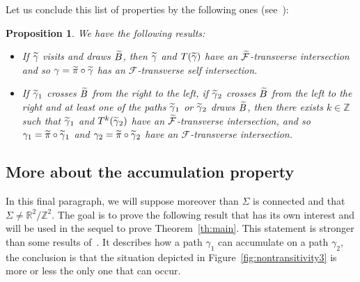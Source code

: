 \documentclass[10pt,a4paper]{article}
\newtheorem{prop}{Proposition}[section]
\theoremstyle{definition}
\theoremstyle{plain}
\numberwithin{equation}{section}
\numberwithin{figure}{section}
\newcommand{\R}{\mathbb{R}}
\newcommand{\Z}{\mathbb{Z}}
\newcommand{\F}{\mathcal{F}}
\let\oldtilde\tilde
\renewcommand*{\tilde}[1]{\mathchoice{\widetilde{#1}}{\widetilde{#1}}{\oldtilde{#1}}{\oldtilde{#1}}}
\begin{document}
Let us conclude this list of properties by the following ones (see~\cite[Section~2.1.2.c]{Lel}):


\begin{prop}\label{prop:transversestrips}
We have the following results:
\begin{itemize}
\item If $\tilde\gamma$ visits and draws $\tilde B$, then $\tilde\gamma$ and $T(\tilde\gamma)$ have an $\tilde{\F}$-transverse intersection and so $\gamma=\tilde\pi\circ\tilde\gamma$ has an $\F$-transverse self intersection.

\item If $\tilde\gamma_1$ crosses $\tilde B$ from the right to the left, if $\tilde\gamma_2$ crosses $\tilde B$ from the left to the right and at least one of the paths $\tilde\gamma_1$ or $\tilde\gamma_2$ draws $\tilde B$, then there exists $k\in \Z$ such that $\tilde\gamma_1$ and $T^k(\tilde\gamma_2)$ have an $\tilde{\F}$-transverse intersection, and so $\gamma_1=\tilde\pi\circ\tilde\gamma_1$ and $\gamma_2=\tilde\pi\circ\tilde\gamma_2$ have an $\F$-transverse intersection.
\end{itemize}
\end{prop}



\subsection{More about the accumulation property}


In this final paragraph, we will suppose moreover than $\Sigma$ is connected and that $\Sigma\not=\R^2/\Z^2$. The goal is to prove the following result that has its own interest and will be used in the sequel to prove Theorem~\ref{th:main}. This statement is stronger than some results of~\cite[Section~2.1.1]{Lel}. It describes how a path $\gamma_1$ can accumulate on a path $\gamma_2$, the conclusion is that the situation depicted in Figure~\ref{fig:nontransitivity3} is more or less the only one that can occur.
\end{document}
